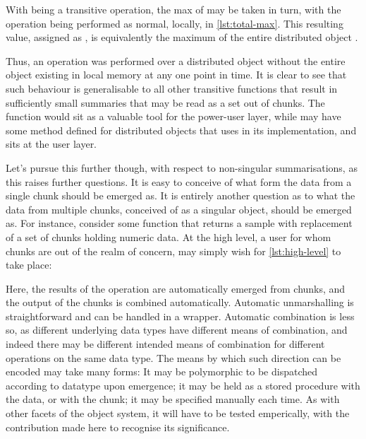 
With  being a transitive operation, the max of
 may be taken in turn, with the operation being performed
as normal, locally, in \cref{lst:total-max}. This resulting value, assigned as , is
equivalently the maximum of the entire distributed object .


Thus, an operation was performed over a distributed object without the
entire object existing in local memory at any one point in time. It is
clear to see that such behaviour is generalisable to all other
transitive functions that result in sufficiently small summaries that
may be read as a set out of chunks. The  function
would sit as a valuable tool for the power-user layer, while
 may have some method defined for distributed objects that
uses  in its implementation, and sits at the user
layer.

Let's pursue this further though, with respect to non-singular
summarisations, as this raises further questions. It is easy to conceive
of what form the data from a single chunk should be emerged as. It is
entirely another question as to what the data from multiple chunks,
conceived of as a singular object, should be emerged as. For instance,
consider some function that returns a sample with replacement of a set
of chunks holding numeric data. At the high level, a user for whom
chunks are out of the realm of concern, may simply wish for \cref{lst:high-level} to take place:


Here, the results of the operation are automatically emerged from
chunks, and the output of the chunks is combined automatically.
Automatic unmarshalling is straightforward and can be handled in a
wrapper. Automatic combination is less so, as different underlying data
types have different means of combination, and indeed there may be
different intended means of combination for different operations on the
same data type. The means by which such direction can be encoded may
take many forms: It may be polymorphic to be dispatched according to
datatype upon emergence; it may be held as a stored procedure with the
data, or with the chunk; it may be specified manually each time. As with
other facets of the object system, it will have to be tested
emperically, with the contribution made here to recognise its
significance.

